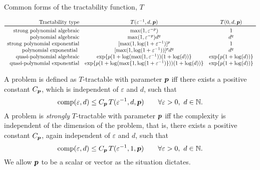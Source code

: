 \documentclass[11pt,a4paper]{article}
\begin{document}
\begin{table} 
    \caption{Common forms of the tractability function, $T$}
{\small
\begin{equation*}
	\begin{array}{r@{\quad}c@{\quad}cc}
		\text{Tractability type} & T(\varepsilon^{-1},d,\vp)
		& T(0,d,\vp)\\
		\toprule
		\text{strong polynomial algebraic} & \max(1,\varepsilon^{-p}) & 1\\
		\text{polynomial algebraic} & \max(1,\varepsilon^{-p})d^{q} & d^{q}\\
		\text{strong polynomial exponential} &  [\max(1,\log(1 + \varepsilon^{-1})]^p & 1\\
		\text{polynomial exponential } &
		[\max(1,\log(1 + \varepsilon^{-1}))]^p  d^{q} & d^{q} \\
        \text{quasi-polynomial algebraic} & 
        \exp\{p(1+\log(\max(1,\varepsilon^{-1}))(1+\log(d))\} &
        \exp\{p(1+\log(d))\}\\
        \text{quasi-polynomial exponential} & 
        \exp\{p(1+\log(\max\{1,\log(1+\varepsilon^{-1})\}))(1+\log(d))\} &
        \exp\{p(1+\log(d))\}
	\end{array}
\end{equation*}}
\label{tab:commonT}
\end{table}

\begin{definition}
    A problem is defined as $T$-tractable with parameter $\boldsymbol{p}$ iff there exists a positive constant $C_{\boldsymbol{p}}$, which is independent of $\varepsilon$ and $d$, such that
\begin{equation} \label{eq:tract_def}
	\operatorname{comp}(\varepsilon,d) \le C_{\boldsymbol{p}}\, T(\varepsilon^{-1},d,\boldsymbol{p}) \qquad \forall \varepsilon >0, \ d \in \mathbb{N}.
\end{equation}
A problem is \emph{strongly}
$T$-tractable with parameter $\boldsymbol{p}$ iff the complexity is independent of the dimension of the problem, that is, there exists a positive constant $C_{\boldsymbol{p}}$, again independent of $\varepsilon$ and $d$, such that
\begin{equation} \label{eq:strong_tract_def}
	\operatorname{comp}(\varepsilon,d) \le C_{\boldsymbol{p}}\, T(\varepsilon^{-1},1,\boldsymbol{p}) \qquad \forall \varepsilon >0 , \ d \in \mathbb{N}.
\end{equation}
We allow $\boldsymbol{p}$ to be a scalar or vector as the situation dictates.
\end{definition}
\end{document}
